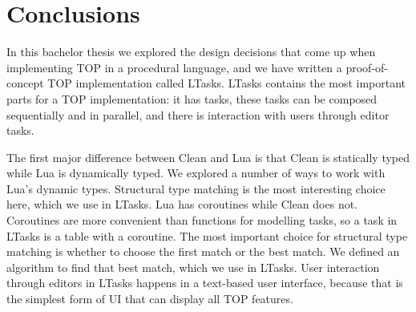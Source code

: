 \chapter{Conclusions}\label{conclusions}

In this bachelor thesis we explored the design decisions that come up when implementing TOP in a procedural language, and we have written a proof-of-concept TOP implementation called LTasks.
LTasks contains the most important parts for a TOP implementation: it has tasks, these tasks can be composed sequentially and in parallel, and there is interaction with users through editor tasks.

The first major difference between Clean and Lua is that Clean is statically typed while Lua is dynamically typed.
We explored a number of ways to work with Lua's dynamic types. Structural type matching is the most interesting choice here, which we use in LTasks.
Lua has coroutines while Clean does not. Coroutines are more convenient than functions for modelling tasks, so a task in LTasks is a table with a coroutine.
The most important choice for structural type matching is whether to choose the first match or the best match. We defined an algorithm to find that best match, which we use in LTasks.
User interaction through editors in LTasks happens in a text-based user interface, because that is the simplest form of UI that can display all TOP features.




